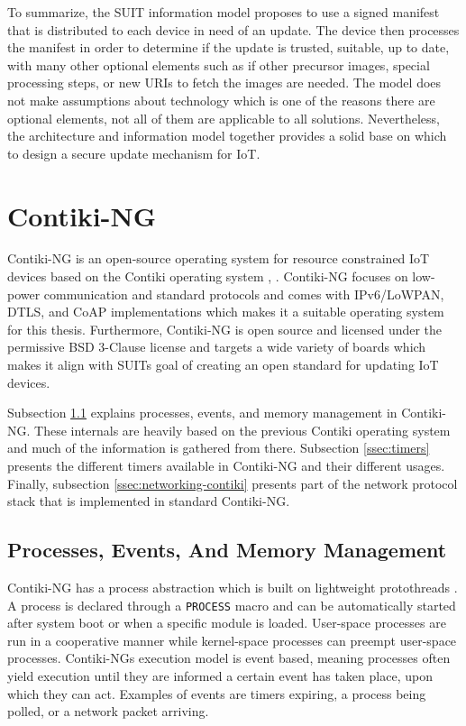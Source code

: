\documentclass[0-thesis.tex]{subfiles}
\begin{document}

To summarize, the SUIT information model proposes to use a signed manifest that is
distributed to each device in need of an update. The device then processes the manifest in
order to determine if the update is trusted, suitable, up to date, with many other
optional elements such as if other precursor images, special processing steps, or new URIs
to fetch the images are needed. The model does not make assumptions about technology which
is one of the reasons there are optional elements, not all of them are applicable to all
solutions. Nevertheless, the architecture and information model together provides a solid
base on which to design a secure update mechanism for IoT.

\section{Contiki-NG}
\label{ssec:contiki-ng}
Contiki-NG is an open-source operating system for resource constrained IoT devices based
on the Contiki operating system \parencite{contiki-ng-github}, \parencite{contiki-github}.
Contiki-NG focuses on low-power communication and standard protocols and comes with
IPv6/LoWPAN, DTLS, and CoAP implementations which makes it a suitable operating system for
this thesis. Furthermore, Contiki-NG is open source and licensed under the permissive BSD
3-Clause license and targets a wide variety of boards which makes it align with SUITs goal
of creating an open standard for updating IoT devices.

Subsection \ref{ssec:process-event-memory} explains processes, events, and memory
management in Contiki-NG. These internals are heavily based on the previous Contiki
operating system and much of the information is gathered from there. Subsection
\ref{ssec:timers} presents the different timers available in Contiki-NG and their
different usages. Finally, subsection \ref{ssec:networking-contiki} presents part of the
network protocol stack that is implemented in standard Contiki-NG.

\subsection{Processes, Events, And Memory Management}
\label{ssec:process-event-memory}
Contiki-NG has a process abstraction which is built on lightweight protothreads
\parencite{protothreads}. A process is declared through a \texttt{PROCESS} macro and can
be automatically started after system boot or when a specific module is loaded. User-space
processes are run in a cooperative manner while kernel-space processes can preempt
user-space processes. Contiki-NGs execution model is event based, meaning processes often
yield execution until they are informed a certain event has taken place, upon which they
can act. Examples of events are timers expiring, a process being polled, or a network
packet arriving. 
\end{document}
